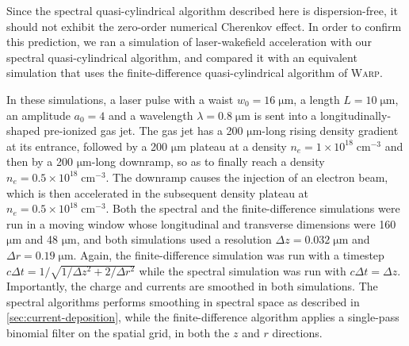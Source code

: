 \documentclass[1p,times]{elsarticle}
\begin{document}
Since the spectral quasi-cylindrical algorithm described here is
dispersion-free, it should not exhibit the zero-order numerical Cherenkov
effect. In order to confirm this prediction, we ran a simulation of
laser-wakefield acceleration with our spectral quasi-cylindrical
algorithm, and compared it with an equivalent simulation that uses 
the finite-difference quasi-cylindrical algorithm of \textsc{Warp}.

In these simulations, a laser pulse with a waist $w_0 = 16\;\mathrm{\mu m}$,
a length $L=10\;\mathrm{\mu m}$, an amplitude $a_0 = 4$ and a
wavelength $\lambda = 0.8\;\mathrm{\mu m}$
is sent into a longitudinally-shaped pre-ionized gas jet. The gas jet
has a 200 $\mathrm{\mu m}$-long rising density gradient at its
entrance, followed by a 200 $\mathrm{\mu m}$ plateau at a density $n_e = 1 \times
 10^{18}\;\mathrm{cm^{-3}}$ and then by a 200 $\mathrm{\mu m}$-long
 downramp, so as to finally reach a density $n_e = 0.5 \times
 10^{18}\;\mathrm{cm^{-3}}$. The downramp causes the injection of an
 electron beam, which is then accelerated in the subsequent density 
plateau at $n_e = 0.5 \times 10^{18}\;\mathrm{cm^{-3}}$. 
Both the spectral and the finite-difference simulations were run in a moving
window whose longitudinal and transverse dimensions were 160 $\mathrm{\mu
  m}$ and 48 $\mathrm{\mu m}$, and both simulations used a resolution
$\Delta z = 0.032 \; \mathrm{\mu m}$ and $\Delta r = 0.19 \; \mathrm{\mu
  m}$. Again, the finite-difference simulation was run with a timestep
$c\Delta t = 1/\sqrt{1/\Delta z^2 + 2/\Delta r^2}$ while the spectral
simulation was run with $c\Delta t = \Delta z$. Importantly, the
charge and currents are smoothed in both
simulations. The spectral algorithms performs smoothing in spectral
space as described in \cref{sec:current-deposition}, while the finite-difference
algorithm applies a single-pass binomial filter on the spatial grid,
in both the $z$ and $r$ directions.
\end{document}
